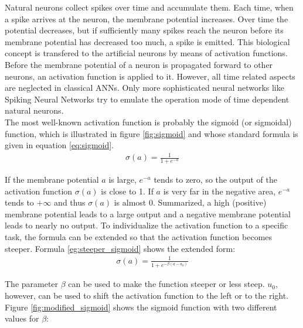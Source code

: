 \documentclass[11pt, a4paper]{article}
\begin{document}
Natural neurons collect spikes over time and accumulate them. Each time, when a spike arrives at the neuron, the membrane potential increases. Over time the potential decreases, but if sufficiently many spikes reach the neuron before its membrane potential has decreased too much, a spike is emitted. This biological concept is transfered to the artificial neurons by means of activation functions. Before the membrane potential of a neuron is propagated forward to other neurons, an activation function is applied to it. However, all time related aspects are neglected in classical \acp{ANN}. Only more sophisticated neural networks like Spiking Neural Networks try to emulate the operation mode of time dependent natural neurons.\\
The most well-known activation function is probably the sigmoid (or sigmoidal) function, which is illustrated in figure \ref{fig:sigmoid} and whose standard formula is given in equation \eqref{eq:sigmoid}.
\begin{align}
\label{eq:sigmoid}
\sigma(a) = \frac{1}{1 + e^{-a}}
\end{align}



If the membrane potential $a$ is large, $e^{-a}$ tends to zero, so the output of the activation function $\sigma(a)$ is close to 1. If $a$ is very far in the negative area, $e^{-a}$ tends to $+\infty$ and thus $\sigma(a)$ is almost $0$. Summarized, a high (positive) membrane potential leads to a large output and a negative membrane potential leads to nearly no output. To individualize the activation function to a specific task, the formula can be extended so that the activation function becomes steeper. Formula \eqref{eg:steeper_sigmoid} shows the extended form:
\begin{align}
\label{eg:steeper_sigmoid}
\sigma(a) = \frac{1}{1 + e^{-\beta (a - a_0)}}
\end{align}

The parameter $\beta$ can be used to make the function steeper or less steep. $u_0$, however, can be used to shift the activation function to the left or to the right. Figure \ref{fig:modified_sigmoid} shows the sigmoid function with two different values for $\beta$:


\end{document}
